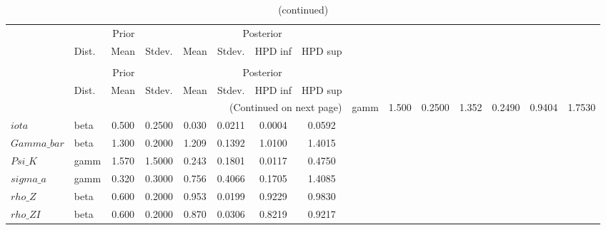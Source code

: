  
\begin{center}
\begin{longtable}{llcccccc} 
\caption{Results from Metropolis-Hastings (parameters)}
 \label{Table:MHPosterior:1}\\
\toprule 
  & \multicolumn{3}{c}{Prior}  &  \multicolumn{4}{c}{Posterior} \\
  \cmidrule(r{.75em}){2-4} \cmidrule(r{.75em}){5-8}
  & Dist. & Mean  & Stdev. & Mean & Stdev. & HPD inf & HPD sup\\
\midrule \endfirsthead 
\caption{(continued)}\\\toprule 
  & \multicolumn{3}{c}{Prior}  &  \multicolumn{4}{c}{Posterior} \\
  \cmidrule(r{.75em}){2-4} \cmidrule(r{.75em}){5-8}
  & Dist. & Mean  & Stdev. & Mean & Stdev. & HPD inf & HPD sup\\
\midrule \endhead 
\bottomrule \multicolumn{8}{r}{(Continued on next page)} \endfoot 
\bottomrule \endlastfoot 
$sigma$ & gamm &   1.500 & 0.2500 &   1.352& 0.2490 &  0.9404 &  1.7530 \\ 
$iota$ & beta &   0.500 & 0.2500 &   0.030& 0.0211 &  0.0004 &  0.0592 \\ 
$Gamma\_bar$ & beta &   1.300 & 0.2000 &   1.209& 0.1392 &  1.0100 &  1.4015 \\ 
$Psi\_K$ & gamm &   1.570 & 1.5000 &   0.243& 0.1801 &  0.0117 &  0.4750 \\ 
$sigma\_a$ & gamm &   0.320 & 0.3000 &   0.756& 0.4066 &  0.1705 &  1.4085 \\ 
$rho\_Z$ & beta &   0.600 & 0.2000 &   0.953& 0.0199 &  0.9229 &  0.9830 \\ 
$rho\_ZI$ & beta &   0.600 & 0.2000 &   0.870& 0.0306 &  0.8219 &  0.9217 \\ 
\end{longtable}
 \end{center}
